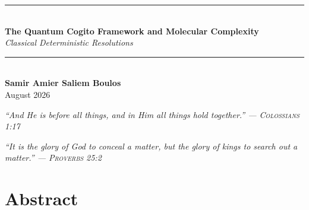 \documentclass[11pt,openany]{extbook}
\theoremstyle{plain}
\theoremstyle{definition}
\begin{document}

\begin{titlepage}
 \centering
 \vspace*{\fill}

 \noindent\rule{\textwidth}{1pt} \\[1.5em]
 {\Huge \textbf{The Quantum Cogito Framework and Molecular Complexity}} \\[1.5em]
 {\Large \textit{Classical Deterministic Resolutions}} \\[1.2em]
 \noindent\rule{\textwidth}{1pt} \\[3cm]
 

 {\Large \textbf{Samir Amier Saliem Boulos}} \\[1cm]
 {\large August 2026}

 \vspace*{\fill}
\end{titlepage}

\frontmatter

\cleardoublepage
\thispagestyle{empty}
\vspace*{0.3\textheight}
\begin{flushright}
 \begin{minipage}{0.7\textwidth}
 \raggedleft
 \Large\itshape
 ``And He is before all things, and in Him all things hold together.''
 \vspace{0.5em}
 \normalsize\normalfont\textsc{— Colossians 1:17}
 \end{minipage}
\end{flushright}

\vspace{2cm}

\begin{flushright}
 \begin{minipage}{0.7\textwidth}
 \raggedleft
 \Large\itshape
 ``It is the glory of God to conceal a matter, but the glory of kings to search out a matter.''
 \vspace{0.5em}
 \normalsize\normalfont\textsc{— Proverbs 25:2}
 \end{minipage}
\end{flushright}


\clearpage


\tableofcontents

\chapter*{Abstract}
\end{document}
